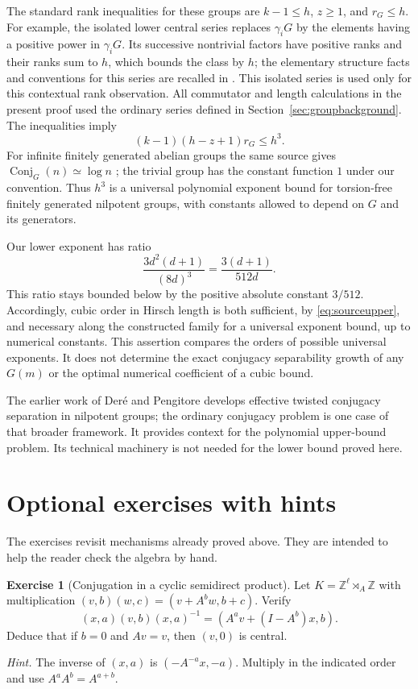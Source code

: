 \documentclass[11pt]{article}
\numberwithin{equation}{section}
\theoremstyle{definition}
\newtheorem{exercise}{Exercise}[section]
\theoremstyle{remark}
\newcommand{\Z}{\mathbb Z}
\newcommand{\Conj}{\operatorname{Conj}}
\begin{document}
The standard rank inequalities for these groups are $k-1\le h$, $z\ge1$, and $r_G\le h$. For example, the isolated lower central series replaces $\gamma_iG$ by the elements having a positive power in $\gamma_iG$. Its successive nontrivial factors have positive ranks and their ranks sum to $h$, which bounds the class by $h$; the elementary structure facts and conventions for this series are recalled in \cite[Section 2.2]{DV}. This isolated series is used only for this contextual rank observation. All commutator and length calculations in the present proof used the ordinary series defined in Section~\ref{sec:groupbackground}. The inequalities imply
\[
(k-1)(h-z+1)r_G\le h^3.
\]
For infinite finitely generated abelian groups the same source gives $\Conj_G(n)\simeq\log n$ \cite[Proposition 2.1.9]{DV}; the trivial group has the constant function $1$ under our convention. Thus $h^3$ is a universal polynomial exponent bound for torsion-free finitely generated nilpotent groups, with constants allowed to depend on $G$ and its generators.

Our lower exponent has ratio
\[
\frac{3d^2(d+1)}{(8d)^3}=\frac{3(d+1)}{512d}.
\]
This ratio stays bounded below by the positive absolute constant $3/512$. Accordingly, cubic order in Hirsch length is both sufficient, by \eqref{eq:sourceupper}, and necessary along the constructed family for a universal exponent bound, up to numerical constants. This assertion compares the orders of possible universal exponents. It does not determine the exact conjugacy separability growth of any $G(m)$ or the optimal numerical coefficient of a cubic bound.

The earlier work of Der\'e and Pengitore \cite{DP} develops effective twisted conjugacy separation in nilpotent groups; the ordinary conjugacy problem is one case of that broader framework. It provides context for the polynomial upper-bound problem. Its technical machinery is not needed for the lower bound proved here.

\appendix
\section{Optional exercises with hints}\label{sec:exercises}
The exercises revisit mechanisms already proved above. They are intended to help the reader check the algebra by hand.

\begin{exercise}[Conjugation in a cyclic semidirect product]
Let $K=\Z^\ell\rtimes_A\Z$ with multiplication $(v,b)(w,c)=(v+A^b w,b+c)$. Verify
\[
(x,a)(v,b)(x,a)^{-1}=(A^av+(I-A^b)x,b).
\]
Deduce that if $b=0$ and $A v=v$, then $(v,0)$ is central.
\end{exercise}
\noindent\emph{Hint.} The inverse of $(x,a)$ is $(-A^{-a}x,-a)$. Multiply in the indicated order and use $A^aA^b=A^{a+b}$.
\end{document}
